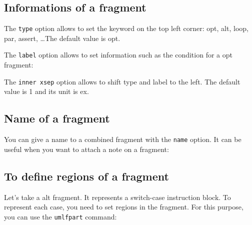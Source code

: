 \documentclass[a4paper,11pt]{report}
\begin{document}
\subsection{Informations of a fragment}\label{ss.fraginfos}

The {\tt type} option allows to set the keyword on the top left corner: opt, alt, loop, par, assert, \ldots The default value is opt.

The {\tt label} option allows to set information such as the condition for a opt fragment:

\medskip

\begin{minipage}{0.5\textwidth}
	
\end{minipage}
\begin{minipage}{0.5\textwidth}
	\begin{center}
	\end{center}
\end{minipage}

\medskip

The {\tt inner xsep} option allows to shift type and label to the left. The default value is 1 and its unit is ex.

\subsection{Name of a fragment}\label{ss.fragname}

You can give a name to a combined fragment with the {\tt name} option. It can be useful when you want to attach a note on a fragment:

\medskip

\begin{minipage}{0.5\textwidth}
	
\end{minipage}
\begin{minipage}{0.5\textwidth}
	\begin{center}
	\end{center}
\end{minipage}

\subsection{To define regions of a fragment}\label{ss.fragpart}

Let's take a alt fragment. It represents a switch-case instruction block. To represent each case, you need to set regions in the fragment. For this purpose, you can use the {\tt umlfpart} command:
\end{document}

